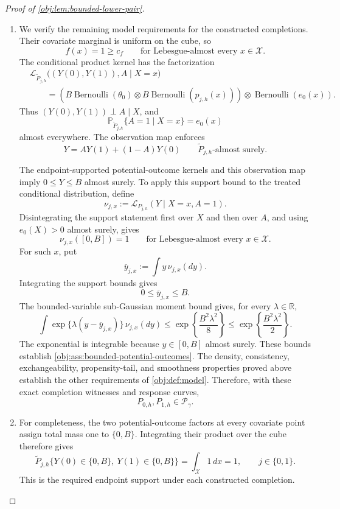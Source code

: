 \begin{proof}[Proof of \cref{obj:lem:bounded-lower-pair}]
\begin{enumerate}
\item We verify the remaining model requirements for the constructed
completions. Their covariate marginal is uniform on the cube, so
\[
f(x)=1\ge c_f
\qquad\text{for Lebesgue-almost every }x\in\mathcal X.
\]
The conditional product kernel has the factorization
\[
\begin{aligned}
&\mathcal L_{\widetilde P_{j,h}}
   \bigl((Y(0),Y(1)),A\mid X=x\bigr)\\
&\qquad=
\left(
B\operatorname{Bernoulli}(\theta_0)
\otimes
B\operatorname{Bernoulli}(p_{j,h}(x))
\right)
\otimes\operatorname{Bernoulli}(e_0(x)).
\end{aligned}
\]
Thus \((Y(0),Y(1))\perp A\mid X\), and
\[
\mathbb P_{\widetilde P_{j,h}}\{A=1\mid X=x\}=e_0(x)
\]
almost everywhere. The observation map enforces
\[
Y=AY(1)+(1-A)Y(0)
\qquad\widetilde P_{j,h}\text{-almost surely}.
\]

The endpoint-supported potential-outcome kernels and this observation
map imply \(0\le Y\le B\) almost surely. To apply this support bound to
the treated conditional distribution, define
\[
\nu_{j,x}:=\mathcal L_{P_{j,h}}(Y\mid X=x,A=1).
\]
Disintegrating the support statement first over \(X\) and then over
\(A\), and using \(e_0(X)>0\) almost surely, gives
\[
\nu_{j,x}([0,B])=1
\qquad\text{for Lebesgue-almost every }x\in\mathcal X.
\]
For such \(x\), put
\[
\overline y_{j,x}:=\int y\,\nu_{j,x}(dy).
\]
Integrating the support bounds gives
\[
0\le\overline y_{j,x}\le B.
\]
The bounded-variable sub-Gaussian moment bound gives, for every
\(\lambda\in\mathbb R\),
\[
\int
\exp\{\lambda(y-\overline y_{j,x})\}\,\nu_{j,x}(dy)
\le
\exp\left\{\frac{B^2\lambda^2}{8}\right\}
\le
\exp\left\{\frac{B^2\lambda^2}{2}\right\}.
\]
The exponential is integrable because \(y\in[0,B]\) almost surely.
These bounds establish
\cref{obj:ass:bounded-potential-outcomes}. The density, consistency,
exchangeability, propensity-tail, and smoothness properties proved
above establish the other requirements of \cref{obj:def:model}.
Therefore, with these exact completion witnesses and response curves,
\[
P_{0,h},P_{1,h}\in\mathcal P_\gamma.
\]

\item For completeness, the two potential-outcome factors at every
covariate point assign total mass one to \(\{0,B\}\). Integrating their
product over the cube therefore gives
\[
\widetilde P_{j,h}
\{Y(0)\in\{0,B\},\ Y(1)\in\{0,B\}\}
=
\int_{\mathcal X}1\,dx
=1,
\qquad j\in\{0,1\}.
\]
This is the required endpoint support under each constructed completion.


\end{enumerate}
\end{proof}
